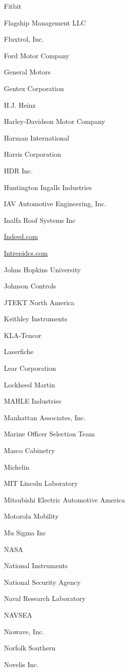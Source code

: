 \documentclass[twoside]{article}
\begin{document}
\begin{center}
\begin{multicols}{5}
\begin{FlushLeft}
\begin{compactitem}
\item Fitbit
\item Flagship Management LLC
\item Fluxtrol, Inc.
\item Ford Motor Company
\item General Motors
\item Gentex Corporation
\item H.J. Heinz
\item Harley-Davidson Motor Company
\item Harman International
\item Harris Corporation
\item HDR Inc.
\item Huntington Ingalls Industries
\item IAV Automotive Engineering, Inc.
\item Inalfa Roof Systems Inc
\item \url{Indeed.com}
\item \url{Intrepidcs.com}
\item Johns Hopkins University
\item Johnson Controls
\item JTEKT North America
\item Keithley Instruments
\item KLA-Tencor
\item Laserfiche
\item Lear Corporation
\item Lockheed Martin
\item MAHLE Industries
\item Manhattan Associates, Inc.
\item Marine Officer Selection Team
\item Masco Cabinetry
\item Michelin
\item MIT Lincoln Laboratory
\item Mitsubishi Electric Automotive America
\item Motorola Mobility
\item Mu Sigma Inc
\item NASA
\item National Instruments
\item National Security Agency
\item Naval Research Laboratory
\item NAVSEA
\item Niowave, Inc.
\item Norfolk Southern
\item Novelis Inc.

\end{compactitem}
\end{FlushLeft}
\end{multicols}
\end{center}
\end{document}
